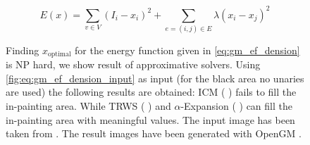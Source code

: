 \begin{equation} \label{eq:gm_ef_dension}
E(x) = \sum_{v \in V}  (I_i - x_i)^2 + \sum_{e=(i,j) \in E } \lambda (x_i-x_j)^2
\end{equation}

\begin{figure}[H]
    \centering
    \caption[Energy based truncated denoising]{
        Finding $x_{\text{optimal}} $ for the energy function given
        in \cref{eq:gm_ef_dension} is NP hard, we show result of approximative solvers.
        Using \cref{fig:eq:gm_ef_dension_input} as input (for the black area no unaries 
        are used)
        the following
        results are obtained:
        ICM
         \citep{besag_1986_icm}  ( ) fails
        to fill the in-painting area. 
        While TRWS
        \citep{kolmogorov_2006_pami_trws}  ( ) 
        and $\alpha$-Expansion
        \citep{boykov_2001_pami}  ( ) 
        can fill the in-painting area
        with meaningful values.
        The input image has been taken from \citep{szeliski_2008_pami}.
        The result images have been generated with OpenGM \citep{andres_2012_opengm_arxiv}.
    }\label{fig:gm_ef_denoise}
\end{figure}

